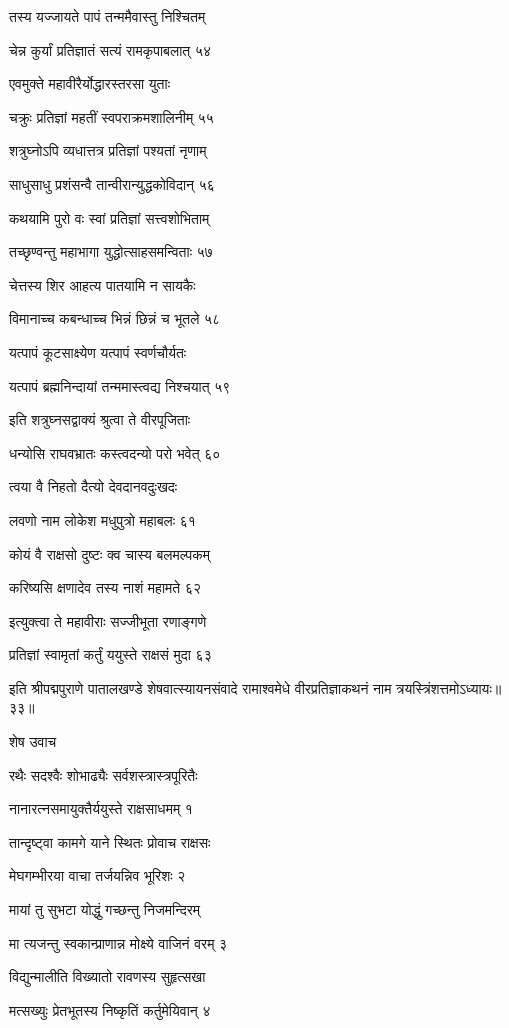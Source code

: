 तस्य यज्जायते पापं तन्ममैवास्तु निश्चितम्

चेन्न कुर्यां प्रतिज्ञातं सत्यं रामकृपाबलात् ५४

एवमुक्ते महावीरैर्योद्धारस्तरसा युताः

चक्रुः प्रतिज्ञां महतीं स्वपराक्रमशालिनीम् ५५

शत्रुघ्नोऽपि व्यधात्तत्र प्रतिज्ञां पश्यतां नृणाम्

साधुसाधु प्रशंसन्वै तान्वीरान्युद्धकोविदान् ५६

कथयामि पुरो वः स्वां प्रतिज्ञां सत्त्वशोभिताम्

तच्छृण्वन्तु महाभागा युद्धोत्साहसमन्विताः ५७

चेत्तस्य शिर आहत्य पातयामि न सायकैः

विमानाच्च कबन्धाच्च भिन्नं छिन्नं च भूतले ५८

यत्पापं कूटसाक्ष्येण यत्पापं स्वर्णचौर्यतः

यत्पापं ब्रह्मनिन्दायां तन्ममास्त्वद्य निश्चयात् ५९

इति शत्रुघ्नसद्वाक्यं श्रुत्वा ते वीरपूजिताः

धन्योसि राघवभ्रातः कस्त्वदन्यो परो भवेत् ६०

त्वया वै निहतो दैत्यो देवदानवदुःखदः

लवणो नाम लोकेश मधुपुत्रो महाबलः ६१

कोयं वै राक्षसो दुष्टः क्व चास्य बलमल्पकम्

करिष्यसि क्षणादेव तस्य नाशं महामते ६२

इत्युक्त्वा ते महावीराः सज्जीभूता रणाङ्गणे

प्रतिज्ञां स्वामृतां कर्तुं ययुस्ते राक्षसं मुदा ६३

इति श्रीपद्मपुराणे पातालखण्डे शेषवात्स्यायनसंवादे रामाश्वमेधे वीरप्रतिज्ञाकथनं नाम त्रयस्त्रिंशत्तमोऽध्यायः॥३३॥


शेष उवाच

रथैः सदश्वैः शोभाढ्यैः सर्वशस्त्रास्त्रपूरितैः

नानारत्नसमायुक्तैर्ययुस्ते राक्षसाधमम् १

तान्दृष्ट्वा कामगे याने स्थितः प्रोवाच राक्षसः

मेघगम्भीरया वाचा तर्जयन्निव भूरिशः २

मायां तु सुभटा योद्धुं गच्छन्तु निजमन्दिरम्

मा त्यजन्तु स्वकान्प्राणान्न मोक्ष्ये वाजिनं वरम् ३

विद्युन्मालीति विख्यातो रावणस्य सुहृत्सखा

मत्सख्युः प्रेतभूतस्य निष्कृतिं कर्तुमेयिवान् ४

